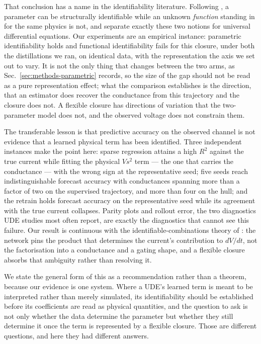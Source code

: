 \documentclass{article}
\begin{document}
That conclusion has a name in the identifiability literature. Following
\citet{loman2026structural}, a parameter can be structurally identifiable while
an unknown \emph{function} standing in for the same physics is not, and
\citet{loman2025ude} separate exactly these two notions for universal
differential equations. Our experiments are an empirical instance: parametric
identifiability holds and functional identifiability fails for this closure,
under both the distillations we ran, on identical data, with the representation
the axis we set out to vary. It is not the only thing
that changes between the two arms, as Sec.~\ref{sec:methods-parametric} records,
so the size of the gap should not be read as a pure representation effect; what
the comparison establishes is the direction, that an estimator does recover the
conductance from this trajectory and the closure does not.
A flexible closure has directions of
variation that the two-parameter model does not, and the observed voltage does not
constrain them.

The transferable lesson is that predictive accuracy on the observed channel is
not evidence that a learned physical term has been identified. Three independent
instances make the point here: sparse regression attains a high $R^2$ against the
true current while fitting the physical $Vs^2$ term --- the one that carries the
conductance --- with the wrong sign at the representative seed; five seeds reach
indistinguishable forecast accuracy with conductances spanning more than a factor
of two on the supervised trajectory, and more than four on the hull; and the retrain holds forecast accuracy on the representative seed while
its agreement with the true current collapses. Parity plots and rollout error,
the two diagnostics UDE studies most often report, are exactly the diagnostics
that cannot see this failure. Our result is continuous with the
identifiable-combinations theory of \citet{walch2016}: the network pins the
product that determines the current's contribution to $dV/dt$, not the
factorisation into a conductance and a gating shape, and a flexible closure
absorbs that ambiguity rather than resolving it.

We state the general form of this as a recommendation rather than a theorem,
because our evidence is one system. Where a UDE's learned term is meant to be
interpreted rather than merely simulated, its identifiability should be
established before its coefficients are read as physical quantities, and the
question to ask is not only whether the data determine the parameter but whether
they still determine it once the term is represented by a flexible closure. Those
are different questions, and here they had different answers.
\end{document}
